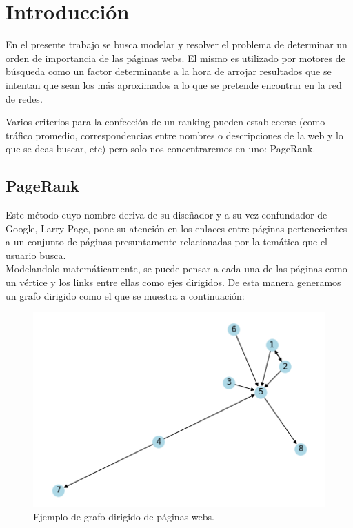 \section{Introducción}

En el presente trabajo se busca modelar y resolver el problema de determinar un orden de importancia de las páginas webs. El mismo es utilizado por motores de búsqueda como un factor determinante a la hora de arrojar resultados que se intentan que sean los más aproximados a lo que se pretende encontrar en la red de redes.

Varios criterios para la confección de un ranking pueden establecerse (como tráfico promedio, correspondencias entre nombres o descripciones de la web y lo que se deas buscar, etc) pero solo nos concentraremos en uno: PageRank.  \\

\subsection{PageRank}

Este método cuyo nombre deriva de su diseñador y a su vez confundador de Google, Larry Page, pone su atención en los enlaces entre páginas pertenecientes a un conjunto de páginas presuntamente relacionadas por la temática que el usuario busca.\\

Modelandolo matemáticamente, se puede pensar a cada una de las páginas como un vértice y los links entre ellas como ejes dirigidos. De esta manera generamos un grafo dirigido como el que se muestra a continuación:   

\begin{figure}[H]
   \begin{center}
     \includegraphics{img/ejemplo.png} 
  \end{center}
\caption{Ejemplo de grafo dirigido de páginas webs.} \label{fig:ejemplo}
\end{figure}

